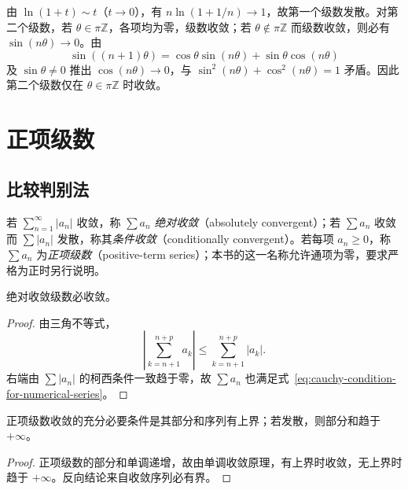 \documentclass[UTF8,12pt,a4paper,fontset=fandol]{ctexbook}
\begin{document}
\begin{solve}
由 $\ln(1+t)\sim t$（$t\to0$），有 $n\ln(1+1/n)\to1$，故第一个级数发散。对第二个级数，若 $\theta\in\pi\mathbb Z$，各项均为零，级数收敛；若 $\theta\notin\pi\mathbb Z$ 而级数收敛，则必有 $\sin(n\theta)\to0$。由
\[
    \sin((n+1)\theta)
    =\cos\theta\sin(n\theta)+\sin\theta\cos(n\theta)
\]
及 $\sin\theta\neq0$ 推出 $\cos(n\theta)\to0$，与 $\sin^2(n\theta)+\cos^2(n\theta)=1$ 矛盾。因此第二个级数仅在 $\theta\in\pi\mathbb Z$ 时收敛。
\end{solve}

\section{正项级数}
\label{sec:positive-term-series}

\subsection{比较判别法}
\label{subsec:comparison-tests-for-series}

\begin{definition}
若 $\sum_{n=1}^{\infty}|a_n|$ 收敛，称 $\sum a_n$ \emph{绝对收敛}（absolutely convergent）；若 $\sum a_n$ 收敛而 $\sum|a_n|$ 发散，称其\emph{条件收敛}（conditionally convergent）。若每项 $a_n\geq0$，称 $\sum a_n$ 为\emph{正项级数}（positive-term series）；本书的这一名称允许通项为零，要求严格为正时另行说明。
\end{definition}

\begin{proposition}
\label{prop:absolute-convergence-implies-convergence}
绝对收敛级数必收敛。
\end{proposition}

\begin{proof}
由三角不等式，
\[
    \left|\sum_{k=n+1}^{n+p}a_k\right|
    \leq\sum_{k=n+1}^{n+p}|a_k|.
\]
右端由 $\sum|a_n|$ 的柯西条件一致趋于零，故 $\sum a_n$ 也满足式~\eqref{eq:cauchy-condition-for-numerical-series}。
\end{proof}

\begin{theorem}[正项级数的有界性判据]
\label{thm:positive-series-bounded-partial-sums}
正项级数收敛的充分必要条件是其部分和序列有上界；若发散，则部分和趋于 $+\infty$。
\end{theorem}

\begin{proof}
正项级数的部分和单调递增，故由单调收敛原理，有上界时收敛，无上界时趋于 $+\infty$。反向结论来自收敛序列必有界。
\end{proof}
\end{document}
